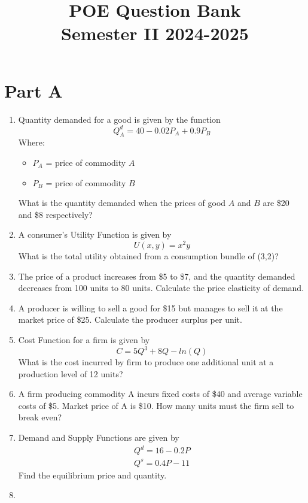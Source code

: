 \documentclass{article}
\title{\vspace{-2cm} \textbf{POE Question Bank \\ Semester II 2024-2025}}
\begin{document}
\date{}
\maketitle
\vspace{-1.5cm}
\noindent\hrulefill
\section*{Part A}
\begin{enumerate}
    \item 
        Quantity demanded for a good is given by the function
        \[
        Q_A^d = 40 - 0.02P_A + 0.9P_B
        \]
        Where:
        \begin{itemize}
            \item $P_A$ = price of commodity $A$
            \item $P_B$ = price of commodity $B$
        \end{itemize}
        What is the quantity demanded when the prices of good $A$ and $B$ are \$20 and \$8 respectively?        
    \item 
        A consumer's Utility Function is given by
        \[
        U(x,y) = x^2y
        \]
        What is the total utility obtained from a consumption bundle of (3,2)?
    \item 
        The price of a product increases from \$5 to \$7, and the quantity demanded decreases from 100 units to 80 units. Calculate the price elasticity of demand. 
    \item 
        A producer is willing to sell a good for \$15 but manages to sell it at the market price of \$25. Calculate the producer surplus per unit.
    \item 
        Cost Function for a firm is given by 
        \[
        C = 5Q^3 + 8Q - ln(Q)
        \]
        What is the cost incurred by firm to produce one additional unit at a production level of 12 units?
    \item
        A firm producing commodity A incurs fixed costs of \$40 and average variable costs of \$5. Market price of A is \$10. How many units must the firm sell to break even?
    \item 
        Demand and Supply Functions are given by 
        \begin{align}
        Q^d = 16-0.2P\\
        Q^s = 0.4P-11
        \end{align}
        Find the equilibrium price and quantity.
    \item 

\end{enumerate}
\end{document}
